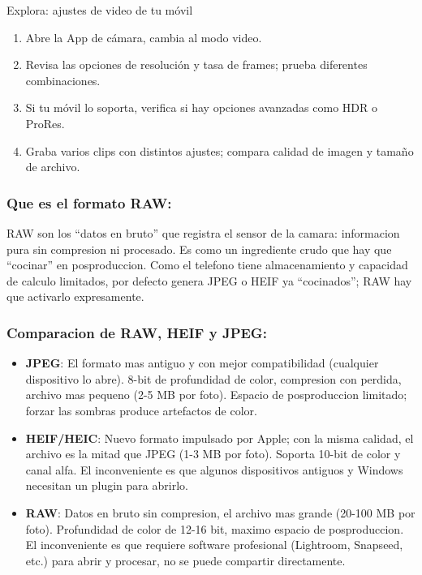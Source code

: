 \begin{tcbpractice}{Explora: ajustes de video de tu móvil}
\begin{enumerate}
  \item Abre la App de cámara, cambia al modo video.
  \item Revisa las opciones de resolución y tasa de frames; prueba diferentes combinaciones.
  \item Si tu móvil lo soporta, verifica si hay opciones avanzadas como HDR o ProRes.
  \item Graba varios clips con distintos ajustes; compara calidad de imagen y tamaño de archivo.
\end{enumerate}

\end{tcbpractice}


\subsubsection*{Que es el formato RAW:}

RAW son los “datos en bruto” que registra el sensor de la camara: informacion pura sin compresion ni procesado. Es como un ingrediente crudo que hay que “cocinar” en posproduccion. Como el telefono tiene almacenamiento y capacidad de calculo limitados, por defecto genera JPEG o HEIF ya “cocinados”; RAW hay que activarlo expresamente.

\subsubsection*{Comparacion de RAW, HEIF y JPEG:}

\begin{itemize}
  \item \textbf{JPEG}: El formato mas antiguo y con mejor compatibilidad (cualquier dispositivo lo abre). 8-bit de profundidad de color, compresion con perdida, archivo mas pequeno (2-5 MB por foto). Espacio de posproduccion limitado; forzar las sombras produce artefactos de color.
  \item \textbf{HEIF/HEIC}: Nuevo formato impulsado por Apple; con la misma calidad, el archivo es la mitad que JPEG (1-3 MB por foto). Soporta 10-bit de color y canal alfa. El inconveniente es que algunos dispositivos antiguos y Windows necesitan un plugin para abrirlo.
  \item \textbf{RAW}: Datos en bruto sin compresion, el archivo mas grande (20-100 MB por foto). Profundidad de color de 12-16 bit, maximo espacio de posproduccion. El inconveniente es que requiere software profesional (Lightroom, Snapseed, etc.) para abrir y procesar, no se puede compartir directamente.
\end{itemize}


